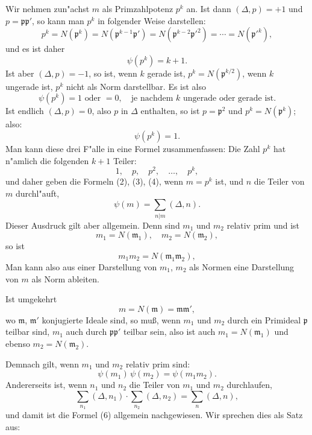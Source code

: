 \documentclass[12pt,a4paper]{article}
\theoremstyle{plain}
\begin{document}
Wir nehmen zun"achst $m$ als Primzahlpotenz $p^k$ an. Ist dann $(\Delta, p) = +1$ und $p = \mathfrak{p}\mathfrak{p}'$, so kann man $p^k$ in folgender Weise darstellen:
\[
p^k = N(\mathfrak{p}^k) = N(\mathfrak{p}^{k-1}\mathfrak{p}') = N(\mathfrak{p}^{k-2}\mathfrak{p}'^2) = \cdots = N(\mathfrak{p}'^k),
\]
und es ist daher
\begin{equation}
\psi(p^k) = k + 1.
\tag{2}
\end{equation}
Ist aber $(\Delta, p) = -1$, so ist, wenn $k$ gerade ist, $p^k = N(\mathfrak{p}^{k/2})$, wenn $k$ ungerade ist, $p^k$ nicht als Norm darstellbar. Es ist also
\begin{equation}
\psi(p^k) = 1 \text{ oder } = 0,\quad \text{je nachdem } k \text{ ungerade oder gerade ist.}
\tag{3}
\end{equation}
Ist endlich $(\Delta, p) = 0$, also $p$ in $\Delta$ enthalten, so ist $p = \mathfrak{p}^2$ und $p^k = N(\mathfrak{p}^k)$; also:
\begin{equation}
\psi(p^k) = 1.
\tag{4}
\end{equation}
Man kann diese drei F"alle in eine Formel zusammenfassen: Die Zahl $p^k$ hat n"amlich die folgenden $k+1$ Teiler:
\begin{equation}
1,\quad p,\quad p^2,\quad \ldots,\quad p^k,
\tag{5}
\end{equation}
und daher geben die Formeln (2), (3), (4), wenn $m = p^k$ ist, und $n$ die Teiler von $m$ durchl"auft,
\begin{equation}
\psi(m) = \sum_{n|m} (\Delta, n).
\tag{6}
\end{equation}
Dieser Ausdruck gilt aber allgemein. Denn sind $m_1$ und $m_2$ relativ prim und ist
\[
m_1 = N(\mathfrak{m}_1),\quad m_2 = N(\mathfrak{m}_2),
\]
so ist
\[
m_1 m_2 = N(\mathfrak{m}_1\mathfrak{m}_2),
\]
Man kann also aus einer Darstellung von $m_1$, $m_2$ als Normen eine Darstellung von $m$ als Norm ableiten.

Ist umgekehrt
\[
m = N(\mathfrak{m}) = \mathfrak{m}\mathfrak{m}',
\]
wo $\mathfrak{m}$, $\mathfrak{m}'$ konjugierte Ideale sind, so mu\ss{}, wenn $m_1$ und $m_2$ durch ein Primideal $\mathfrak{p}$ teilbar sind, $m_1$ auch durch $\mathfrak{p}\mathfrak{p}'$ teilbar sein, also ist auch $m_1 = N(\mathfrak{m}_1)$ und ebenso $m_2 = N(\mathfrak{m}_2)$.

Demnach gilt, wenn $m_1$ und $m_2$ relativ prim sind:
\begin{equation}
\psi(m_1)\,\psi(m_2) = \psi(m_1 m_2).
\tag{7}
\end{equation}
Andererseits ist, wenn $n_1$ und $n_2$ die Teiler von $m_1$ und $m_2$ durchlaufen,
\[
\sum_{n_1} (\Delta, n_1) \cdot \sum_{n_2} (\Delta, n_2) = \sum_{n} (\Delta, n),
\]
und damit ist die Formel (6) allgemein nachgewiesen. Wir sprechen dies als Satz aus:
\end{document}
